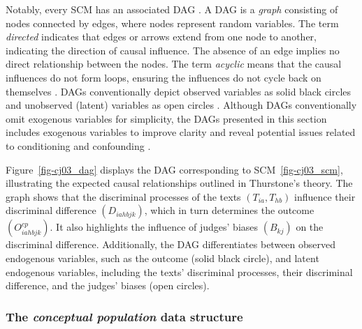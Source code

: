 \documentclass[
  authoryear,
  review,
  1p]{elsarticle}
\begin{document}
Notably, every SCM has an associated DAG
\citep{Pearl_et_al_2016, Cinelli_et_al_2020}. A DAG is a \emph{graph}
consisting of nodes connected by edges, where nodes represent random
variables. The term \emph{directed} indicates that edges or arrows
extend from one node to another, indicating the direction of causal
influence. The absence of an edge implies no direct relationship between
the nodes. The term \emph{acyclic} means that the causal influences do
not form loops, ensuring the influences do not cycle back on themselves
\citep{McElreath_2020}. DAGs conventionally depict observed variables as
solid black circles and unobserved (latent) variables as open circles
\citep{Morgan_et_al_2014}. Although DAGs conventionally omit exogenous
variables for simplicity, the DAGs presented in this section includes
exogenous variables to improve clarity and reveal potential issues
related to conditioning and confounding \citep{Cinelli_et_al_2020}.

Figure~\ref{fig-cj03_dag} displays the DAG corresponding to
SCM~\ref{fig-cj03_scm}, illustrating the expected causal relationships
outlined in Thurstone's theory. The graph shows that the discriminal
processes of the texts \((T_{ia}, T_{hb})\) influence their discriminal
difference \((D_{iahbjk})\), which in turn determines the outcome
\((O^{cp}_{iahbjk})\). It also highlights the influence of judges'
biases \((B_{kj})\) on the discriminal difference. Additionally, the DAG
differentiates between observed endogenous variables, such as the
outcome (solid black circle), and latent endogenous variables, including
the texts' discriminal processes, their discriminal difference, and the
judges' biases (open circles).

\subsubsection{\texorpdfstring{The \emph{conceptual population} data
structure}{The conceptual population data structure}}\label{sec-theory-theoretical_P2}
\end{document}

